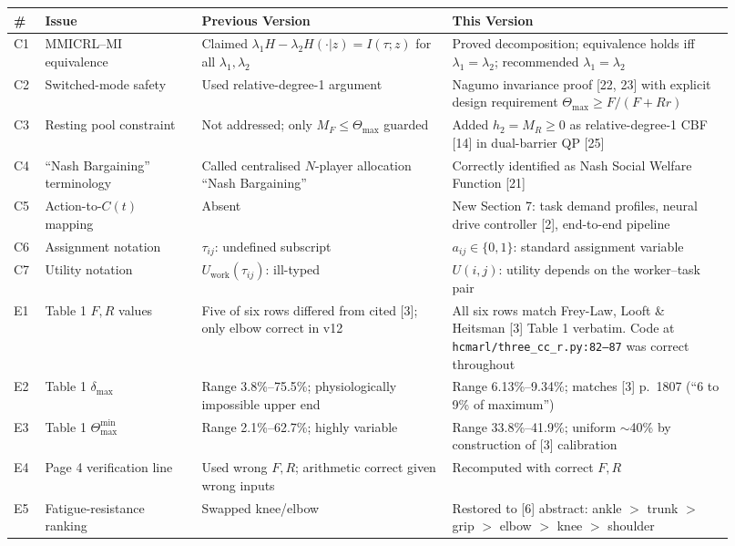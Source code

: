 \documentclass[11pt,a4paper]{article}
\begin{document}
\begin{center}
\small
\begin{tabular}{p{0.04\linewidth}p{0.20\linewidth}p{0.32\linewidth}p{0.36\linewidth}}
\toprule
\textbf{\#} & \textbf{Issue} & \textbf{Previous Version} & \textbf{This Version} \\
\midrule
C1 & MMICRL--MI equivalence & Claimed $\lambda_1 H - \lambda_2 H(\cdot|z) = I(\tau; z)$ for all $\lambda_1, \lambda_2$ & Proved decomposition; equivalence holds iff $\lambda_1 = \lambda_2$; recommended $\lambda_1 = \lambda_2$ \\
C2 & Switched-mode safety & Used relative-degree-1 argument & Nagumo invariance proof [22, 23] with explicit design requirement $\Theta_{\max} \geq F/(F+Rr)$ \\
C3 & Resting pool constraint & Not addressed; only $M_F \leq \Theta_{\max}$ guarded & Added $h_2 = M_R \geq 0$ as relative-degree-1 CBF [14] in dual-barrier QP [25] \\
C4 & ``Nash Bargaining'' terminology & Called centralised $N$-player allocation ``Nash Bargaining'' & Correctly identified as Nash Social Welfare Function [21] \\
C5 & Action-to-$C(t)$ mapping & Absent & New Section 7: task demand profiles, neural drive controller [2], end-to-end pipeline \\
C6 & Assignment notation & $\tau_{ij}$: undefined subscript & $a_{ij} \in \{0,1\}$: standard assignment variable \\
C7 & Utility notation & $U_{\mathrm{work}}(\tau_{ij})$: ill-typed & $U(i, j)$: utility depends on the worker--task pair \\
\midrule
E1 & Table 1 $F, R$ values & Five of six rows differed from cited [3]; only elbow correct in v12 & All six rows match Frey-Law, Looft \& Heitsman [3] Table 1 verbatim. Code at \texttt{hcmarl/three\_cc\_r.py:82--87} was correct throughout \\
E2 & Table 1 $\delta_{\max}$ & Range 3.8\%--75.5\%; physiologically impossible upper end & Range 6.13\%--9.34\%; matches [3] p.~1807 (``6 to 9\% of maximum'') \\
E3 & Table 1 $\Theta_{\max}^{\min}$ & Range 2.1\%--62.7\%; highly variable & Range 33.8\%--41.9\%; uniform $\sim$40\% by construction of [3] calibration \\
E4 & Page 4 verification line & Used wrong $F, R$; arithmetic correct given wrong inputs & Recomputed with correct $F, R$ \\
E5 & Fatigue-resistance ranking & Swapped knee/elbow & Restored to [6] abstract: ankle $>$ trunk $>$ grip $>$ elbow $>$ knee $>$ shoulder \\

\end{tabular}
\end{center}
\end{document}
